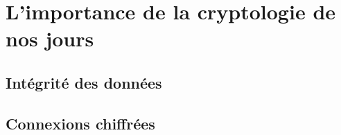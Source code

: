 \chapter{L'importance de la cryptologie de nos jours}





\section{Intégrité des données}
\section{Connexions chiffrées}

